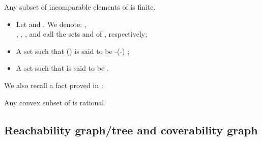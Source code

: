 \documentclass[a4paper]{llncs}
\begin{document}
\begin{lemma} 
\label{l26}
Any subset of incomparable elements of   is finite.
\end{lemma}

\begin{definition}
\label{def_clos}
\begin{itemize}
\item Let  and . We denote:  , \\,  , , and call the sets  and  of , respectively;
\item A set  such that  () is said to be -(-) ;
\item A set  such that   is said to be .
\end{itemize}


\end{definition}
We also recall a fact proved in \cite{BarOch}:

\begin{proposition}
\label{p26}
Any convex subset of  is rational.
\end{proposition}

\subsection{Reachability graph/tree and coverability graph}
\end{document}
